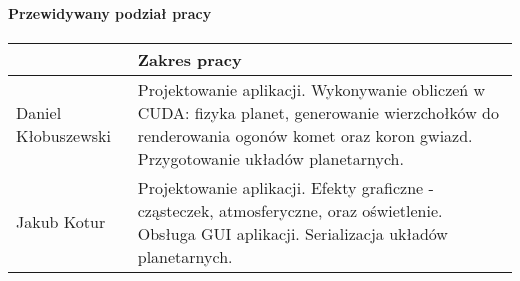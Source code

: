 \documentclass[a4paper,titlepage,10pt]{article}
\begin{document}

	\paragraph{Przewidywany podział pracy}

	\paragraph{}
	\begin{tabular}{|l|p{10cm}|}
	\hline
	~ & Zakres pracy \\\hline
	\hline
	Daniel Kłobuszewski & Projektowanie aplikacji. Wykonywanie obliczeń w CUDA: fizyka planet, generowanie wierzchołków do renderowania ogonów komet oraz koron gwiazd. Przygotowanie układów planetarnych.\\\hline
	Jakub Kotur & Projektowanie aplikacji. Efekty graficzne - cząsteczek, atmosferyczne, oraz oświetlenie. Obsługa GUI aplikacji. Serializacja układów planetarnych.\\\hline
	\end{tabular}

	\vfill
	\hspace{.6\textwidth} \makebox[.3\textwidth][l] {\hrulefill} 

	\hspace{.6\textwidth} 
\end{document}
